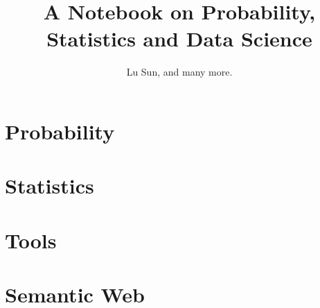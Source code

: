 


\makeindex



\frontmatter

\title{A Notebook on Probability, Statistics and Data Science}
\author{Lu Sun, and many more.}

\maketitle


\tableofcontents


\listoffigures
\listoftables

\mainmatter

\part{Probability}





\part{Statistics}







\part{Tools}









\part{Semantic Web}










\printindex


